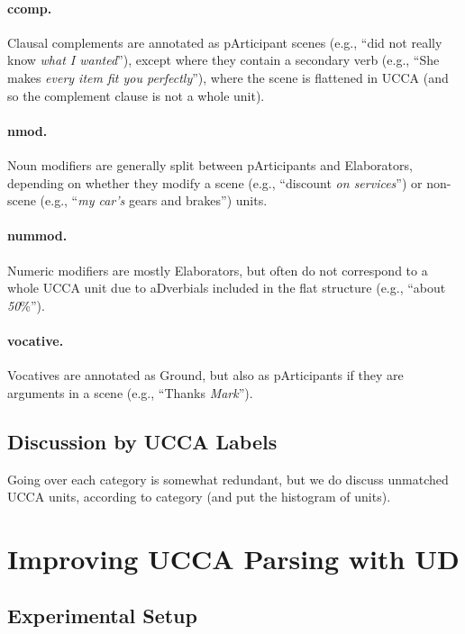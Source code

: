 \documentclass[11pt,a4paper]{article}
\begin{document}
\paragraph{ccomp.}
Clausal complements are annotated as pArticipant scenes
(e.g., ``did not really know \textit{what I wanted}''),
except where they contain a secondary verb
(e.g., ``She makes \textit{every item fit you perfectly}''),
where the scene is flattened in UCCA (and so the complement clause is not a whole unit).

\paragraph{nmod.}
Noun modifiers are generally split between pArticipants and Elaborators,
depending on whether they modify a scene (e.g., ``discount \textit{on services}'')
or non-scene (e.g., ``\textit{my car's} gears and brakes'') units.

\paragraph{nummod.}
Numeric modifiers are mostly Elaborators, but often do not correspond to a whole UCCA unit
due to aDverbials included in the flat structure (e.g., ``about \textit{50}\%'').

\paragraph{vocative.}
Vocatives are annotated as Ground, but also as pArticipants if they are arguments in a scene
(e.g., ``Thanks \textit{Mark}'').



\subsection{Discussion by UCCA Labels}

Going over each category is somewhat redundant, but we do discuss unmatched UCCA units, according to category (and put the histogram of units).



\section{Improving UCCA Parsing with UD}\label{sec:silver}

\subsection{Experimental Setup}\label{sec:experiments}
\end{document}
